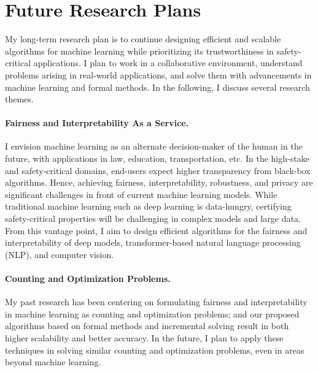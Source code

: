 \documentclass{article}
\begin{document}
	

	
	\section*{Future Research Plans}
	 My long-term research plan is to continue designing efficient and scalable algorithms for machine learning while prioritizing its trustworthiness in safety-critical applications. I plan to work in a collaborative environment, understand problems arising in real-world applications, and solve them with advancements in machine learning and formal methods. In the following, I discuss several research themes.
	 
	 
	 \paragraph{Fairness and Interpretability As a Service.} I envision machine learning as an alternate decision-maker of the human in the future, with applications in law, education, transportation, etc. In the high-stake and safety-critical domains, end-users expect higher transparency from black-box algorithms. Hence, achieving fairness, interpretability, robustness, and privacy are significant challenges in front of current machine learning models. While traditional machine learning such as deep learning is data-hungry, certifying safety-critical properties will be challenging in complex models and large data. From this vantage point, I aim to design efficient algorithms for the fairness and interpretability of deep models, transformer-based natural language processing (NLP), and computer vision. 
	 
	 
	 \paragraph{Counting and Optimization Problems.} My past research has been centering on formulating fairness and interpretability in machine learning as counting and optimization problems; and our proposed algorithms based on formal methods and incremental solving result in both higher scalability and better accuracy. In the future, I plan to apply these techniques in solving similar counting and optimization problems, even in areas beyond machine learning. 
	
	
	
	\small{
		
	}
\end{document}
